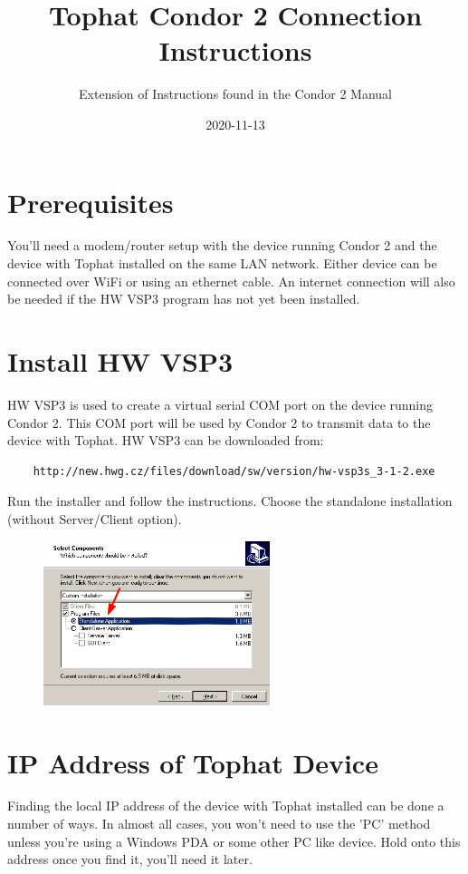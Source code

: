 \documentclass{article}
\title{Tophat Condor 2 Connection Instructions}
\date{2020-11-13}
\author{Extension of Instructions found in the Condor 2 Manual}
\begin{document}
    \maketitle

    \section{Prerequisites}
    You'll need a modem/router setup with the device running Condor 2
    and the device with Tophat installed on the same LAN network. Either device
    can be connected over WiFi or using an ethernet cable. An internet connection will
    also be needed if the HW VSP3 program has not yet been installed.

    \section{Install HW VSP3}
    HW VSP3 is used to create a virtual serial COM port on the device running Condor 2.
    This COM port will be used by Condor 2 to transmit data to the device with Tophat.
    HW VSP3 can be downloaded from:
    \begin{verbatim}
    http://new.hwg.cz/files/download/sw/version/hw-vsp3s_3-1-2.exe
    \end{verbatim}
    Run the installer and follow the instructions. Choose the standalone installation
    (without Server/Client option).

    \begin{figure}[h!]
        \includegraphics[width=250px]{images/hsvp3.png}
    \end{figure}

    \section{IP Address of Tophat Device}
    Finding the local IP address of the device with Tophat installed can be done a number of ways. In almost
    all cases, you won't need to use the 'PC' method unless you're using a Windows PDA or some other
    PC like device. Hold onto this address once you find it, you'll need it later.\\
        
\end{document}
